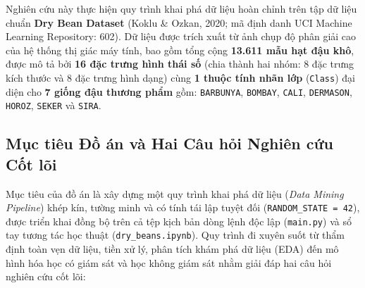 \documentclass[a4paper,12pt]{report}
\begin{document}
Nghiên cứu này thực hiện quy trình khai phá dữ liệu hoàn chỉnh trên tập dữ liệu chuẩn \textbf{Dry Bean Dataset} (Koklu \& Ozkan, 2020; mã định danh UCI Machine Learning Repository: 602). Dữ liệu được trích xuất từ ảnh chụp độ phân giải cao của hệ thống thị giác máy tính, bao gồm tổng cộng \textbf{13.611 mẫu hạt đậu khô}, được mô tả bởi \textbf{16 đặc trưng hình thái số} (chia thành hai nhóm: 8 đặc trưng kích thước và 8 đặc trưng hình dạng) cùng \textbf{1 thuộc tính nhãn lớp} (\texttt{Class}) đại diện cho \textbf{7 giống đậu thương phẩm} gồm: \texttt{BARBUNYA}, \texttt{BOMBAY}, \texttt{CALI}, \texttt{DERMASON}, \texttt{HOROZ}, \texttt{SEKER} và \texttt{SIRA}.

\subsection{Mục tiêu Đồ án và Hai Câu hỏi Nghiên cứu Cốt lõi}
Mục tiêu của đồ án là xây dựng một quy trình khai phá dữ liệu (\textit{Data Mining Pipeline}) khép kín, tường minh và có tính tái lập tuyệt đối (\texttt{RANDOM\_STATE = 42}), được triển khai đồng bộ trên cả tệp kịch bản dòng lệnh độc lập (\texttt{main.py}) và sổ tay tương tác học thuật (\texttt{dry\_beans.ipynb}). Quy trình đi xuyên suốt từ thẩm định toàn vẹn dữ liệu, tiền xử lý, phân tích khám phá dữ liệu (EDA) đến mô hình hóa học có giám sát và học không giám sát nhằm giải đáp hai câu hỏi nghiên cứu cốt lõi:
\end{document}
